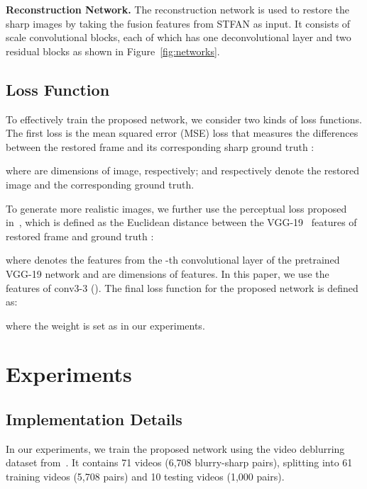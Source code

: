 \documentclass[10pt,twocolumn,letterpaper]{article}
\begin{document}
\noindent \textbf{Reconstruction Network.}
The reconstruction network is used to restore the sharp images by taking the fusion features from STFAN as input. 
It consists of scale convolutional blocks, each of which has one deconvolutional layer and two residual blocks as shown in Figure~\ref{fig:networks}.
\subsection{Loss Function}\label{sec:loss}
To effectively train the proposed network, we consider two kinds of loss functions.
The first loss is the mean squared error (MSE) loss that measures the differences between the restored frame  and its corresponding sharp ground truth :

where  are dimensions of image, respectively;  and  respectively denote the restored image and the corresponding ground truth.


To generate more realistic images, we further use the perceptual loss proposed in~\cite{johnson2016perceptual}, which is defined as the Euclidean distance between the VGG-19~\cite{simonyan2015very} features of restored frame  and ground truth :

where  denotes the features from the -th convolutional layer of the pretrained VGG-19 network and  are dimensions of features. In this paper, we use the features of conv3-3 ().
The final loss function for the proposed network is defined as:

where the weight  is set as  in our experiments.
\section{Experiments}
\subsection{Implementation Details}
In our experiments, we train the proposed network using the video deblurring dataset from~\cite{su2017deep}.
It contains 71 videos (6,708 blurry-sharp pairs), splitting into 61 training videos (5,708 pairs) and 10 testing videos (1,000 pairs).
\end{document}
